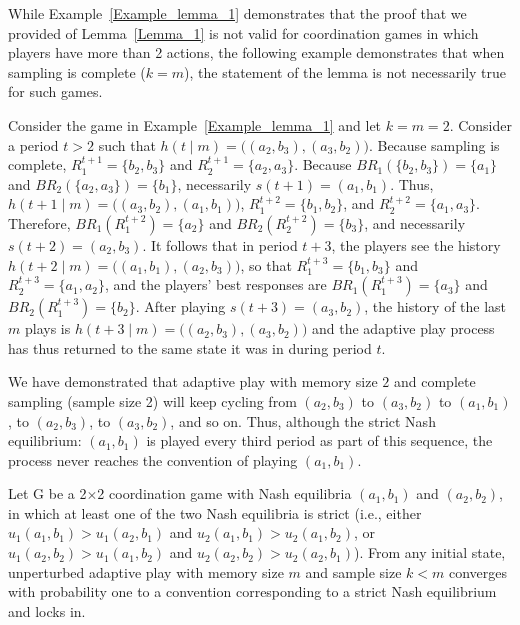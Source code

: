 While Example~\ref{Example_lemma_1} demonstrates that the proof that we provided of Lemma~\ref{Lemma_1} is not valid for coordination games in which players have more than 2 actions, the following example demonstrates that when sampling is complete ($k=m$), the statement of the lemma is not necessarily true for such games.  

\begin{example}\label{Example2_lemma_1} 
Consider the game in Example~\ref{Example_lemma_1} and let $k = m = 2$. Consider a period 
$t > 2$ such that  $h(t\mid m) = \big((a_2, b_3), (a_3, b_2)\big)$. Because sampling is complete, $R_1^{t+1} = \{b_2, b_3\}$ and $R_2^{t+1} = \{a_2, a_3\}$. 
Because $BR_1(\{b_2, b_3\})=\{a_1\}$ and $BR_2(\{a_2, a_3\})=\{b_1\}$, necessarily $s(t+1) = (a_1, b_1)$. 
%
Thus, $h(t+1\mid m) = \big((a_3, b_2), (a_1, b_1)\big)$, $R_1^{t+2} = \{b_1, b_2\}$, and $R_2^{t+2} = \{a_1, a_3\}$. 
Therefore, $BR_1(R_1^{t+2})=\{a_2\}$ and $BR_2(R_2^{t+2})=\{b_3\}$, and necessarily $s(t+2) = (a_2, b_3)$. 
%
It follows that in period $t+3$, the players see the history $h(t+2\mid m) = \big((a_1,b_1),(a_2, b_3)\big)$, 
so that $R_1^{t+3} = \{b_1, b_3\}$ and $R_2^{t+3} = \{a_1, a_2\}$, and the players' best responses are $BR_1(R_1^{t+3})=\{a_3\}$ and $BR_2(R_1^{t+3})=\{b_2\}$. 
%
After playing $s(t+3) = (a_3, b_2)$, the history of the last $m$ plays is $h(t+3\mid m) = \big((a_2, b_3), (a_3, b_2)\big)$ and the adaptive play process has thus returned to the same state it was in during period $t$. 

We have demonstrated that adaptive play with memory size $2$ and complete sampling (sample size 2) will keep cycling from $(a_2, b_3)$ to $(a_3, b_2)$ to $(a_1, b_1)$, to $(a_2, b_3)$, to  $(a_3, b_2)$, and so on.  
%
Thus, although the strict Nash equilibrium: $(a_1, b_1)$ is played every third period as part of this sequence, the process never reaches the convention of playing $(a_1, b_1)$. 
\end{example}



\begin{theorem}\label{Theorem_1}
Let G be a 2$\times$2 coordination game with Nash equilibria $(a_1,b_1)$ and $(a_2,b_2)$,  
in which at least one of the two Nash equilibria is strict (i.e., either $u_1(a_1,b_1) > u_1(a_2,b_1)$ and $u_2(a_1,b_1) > u_2(a_1,b_2)$, or $u_1(a_2,b_2) > u_1(a_1,b_2)$ and $u_2(a_2,b_2) > u_2(a_2,b_1)$). 
%
From any initial state, unperturbed adaptive play with memory size $m$ and sample size $k < m$ converges with probability one to a convention corresponding to a strict Nash equilibrium and locks in.
\end{theorem}


